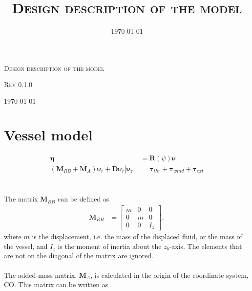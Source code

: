 \documentclass[a4paper]{article}
\title{\textsc{Design description of the model}}
\date{\today}
\begin{document}
\begin{titlepage}
	\centering
	{\scshape\LARGE Design description of the model \par}
	\vspace{1cm}
	{\scshape\Large Rev 0.1.0 \par}
	\vspace{2cm}
	\vfill

	{\large \today\par}
\end{titlepage}

\thispagestyle{empty}
\newpage

\setcounter{tocdepth}{3}
\tableofcontents
\setcounter{secnumdepth}{3}
\newpage

\section{Vessel model}

\begin{equation}
\label{eq:vessel_model}
\begin{aligned}
	\boldsymbol{\dot{\eta}} &= \boldsymbol{R} (\psi) \boldsymbol{\nu} \\
	(\boldsymbol{M}_{RB} + \boldsymbol{M}_A) \boldsymbol{\dot{\nu}}_r + \boldsymbol{D} \boldsymbol{\nu}_r |\boldsymbol{\nu_r}| &= \boldsymbol{\tau}_{thr} + \boldsymbol{\tau}_{wind} + \boldsymbol{\tau}_{ext}
\end{aligned}
\end{equation}
\\
\\
The matrix $\boldsymbol{M}_{RB}$ can be defined as
\begin{equation}
\label{eq:MRB_matrix}
\begin{aligned}
	\boldsymbol{M}_{RB} &=
		\left[ \begin{array}{ccc}
			m &  0 & 0 \\
			0 &  m & 0 \\
			0 &  0 &  I_z 
		\end{array} \right],
\end{aligned}
\end{equation}
%
where $m$ is the displacement, i.e. the mass of the displaced fluid, or the mass of the vessel, and $I_z$ is the moment of inertia about the $z_b$-axis. The elements that are not on
the diagonal of the matrix are ignored.
\\
\\
The added-mass matrix, $\boldsymbol{M}_A$, is calculated in the origin of the coordinate system, CO. This matrix can be written as
\end{document}
